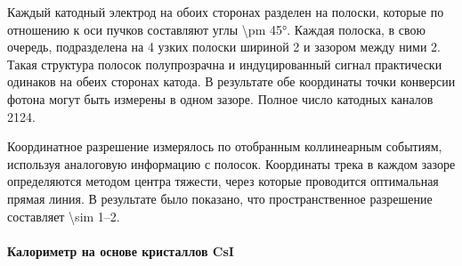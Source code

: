 Каждый катодный электрод на обоих сторонах разделен на полоски,
которые по отношению к оси пучков составляют углы \ang{\pm 45}. 
Каждая полоска, в свою очередь,
подразделена на 4 узких полоски шириной \SI{2}{\mmr} и зазором между ними \SI{2}{\mmr}. 
Такая структура полосок полупрозрачна и индуцированный сигнал практически одинаков на обеих сторонах катода. 
В результате обе координаты точки конверсии фотона могут быть измерены в одном зазоре.
Полное число катодных каналов \num{2124}.

Координатное разрешение измерялось по отобранным коллинеарным событиям,
используя аналоговую информацию с полосок. 
Координаты трека в каждом зазоре определяются методом центра тяжести,
через которые проводится оптимальная прямая
линия. 
В результате было показано,
что пространственное разрешение составляет \SIrange{\sim 1}{2}{\mmr}.



\paragraph{Калориметр на основе кристаллов CsI}
\label{sec:csi}

